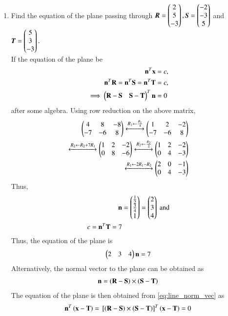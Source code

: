 \begin{enumerate}[label=\arabic*.,ref=\thesubsection.\theenumi]
\item Find the equation of the plane passing through 
$
\bm{R} = \begin{pmatrix}2\\5\\-3\end{pmatrix},
\bm{S}= \begin{pmatrix}-2\\-3\\5\end{pmatrix}
$ 
and 
$
\bm{T}= \begin{pmatrix}5\\3\\-3\end{pmatrix}.
$
\label{prob:plane_3pts}
\\
\solution  If the equation of the plane be 
\begin{align}
\mathbf{n}^T\mathbf{x} &= c,
\\
\mathbf{n}^T\mathbf{R}=\mathbf{n}^T\mathbf{S}=\mathbf{n}^T\mathbf{T}&= c,
\\
\implies \begin{pmatrix}\mathbf{R}-\mathbf{S} & \mathbf{S}-\mathbf{T}\end{pmatrix}^T\mathbf{n} &= 0
\end{align}
%
after some algebra.
Using row reduction on the above matrix, 
\begin{align}
\begin{pmatrix}4 & 8 &-8 \\ -7  & -6 & 8\end{pmatrix} \xleftrightarrow[]{R_1\leftarrow \frac{R_1}{4}}\begin{pmatrix}1 & 2 &-2 \\ -7  & -6 & 8\end{pmatrix}
\\
\xleftrightarrow[]{R_2\leftarrow R_2 + 7R_1}
\begin{pmatrix}
1 & 2 &-2 
\\ 
0  & 8 & -6
\end{pmatrix}
\xleftrightarrow[]{R_2\leftarrow \frac{R_2}{2}}
\begin{pmatrix}
1 & 2 &-2 
\\ 
0  & 4 & -3
\end{pmatrix}
\\
\xleftrightarrow[]{R_1\leftarrow 2R_1-R_2}
\begin{pmatrix}
2 & 0 &-1 
\\ 
0  & 4 & -3
\end{pmatrix}
\end{align}
%
Thus, 
\begin{align}
\mathbf{n} &= \begin{pmatrix}\frac{1}{2}\\\frac{3}{4}\\1\end{pmatrix} = \begin{pmatrix}2\\3\\4\end{pmatrix} \text{ and}
\\
c = \mathbf{n}^{T}\mathbf{T} = 7
\end{align}
%
Thus, the equation of the plane is 
%
\begin{align}
\begin{pmatrix}2 & 3 & 4\end{pmatrix}\mathbf{n} = 7
\end{align}
%
Alternatively, the normal vector to the plane can be obtained as
%
\begin{align}
\mathbf{n} = \left(\mathbf{R}-\mathbf{S}\right) \times \left(\mathbf{S}-\mathbf{T}\right)
\end{align}
%
The equation of the plane is then obtained from \eqref{eq:line_norm_vec} as 
%
\begin{align}
\label{eq:plane_3pts_cross}
\mathbf{n}^T\left(\mathbf{x}-\mathbf{T}\right) = {}\left[\left(\mathbf{R}-\mathbf{S}\right) \times \left(\mathbf{S}-\mathbf{T}\right)\right]^T\left(\mathbf{x}-\mathbf{T}\right) = 0
\end{align}
%


\end{enumerate}
